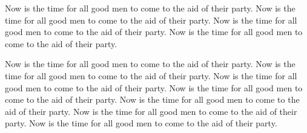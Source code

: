 
Now is the time for all good men to come to the aid of their party.
Now is the time for all good men to come to the aid of their party.
Now is the time for all good men to come to the aid of their party.
Now is the time for all good men to come to the aid of their party.

Now is the time for all good men to come to the aid of their party.
Now is the time for all good men to come to the aid of their party.
Now is the time for all good men to come to the aid of their party.
Now is the time for all good men to come to the aid of their party.
Now is the time for all good men to come to the aid of their party.
Now is the time for all good men to come to the aid of their party.
Now is the time for all good men to come to the aid of their party.


\bye
